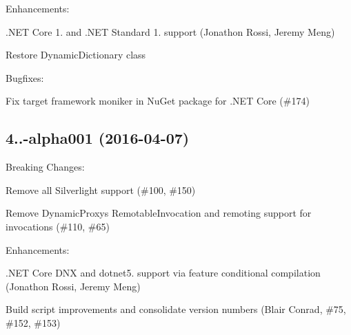 Enhancements\+:
\begin{DoxyItemize}
\item .N\+ET Core 1. and .N\+ET Standard 1. support (Jonathon Rossi, Jeremy Meng)
\item Restore Dynamic\+Dictionary class
\end{DoxyItemize}

Bugfixes\+:
\begin{DoxyItemize}
\item Fix target framework moniker in Nu\+Get package for .N\+ET Core (\#174)
\end{DoxyItemize}

\subsection*{4..-\/alpha001 (2016-\/04-\/07)}

Breaking Changes\+:
\begin{DoxyItemize}
\item Remove all Silverlight support (\#100, \#150)
\item Remove Dynamic\+Proxy\textquotesingle{}s Remotable\+Invocation and remoting support for invocations (\#110, \#65)
\end{DoxyItemize}

Enhancements\+:
\begin{DoxyItemize}
\item .N\+ET Core D\+NX and dotnet5. support via feature conditional compilation (Jonathon Rossi, Jeremy Meng)
\item Build script improvements and consolidate version numbers (Blair Conrad, \#75, \#152, \#153)
\end{DoxyItemize}


